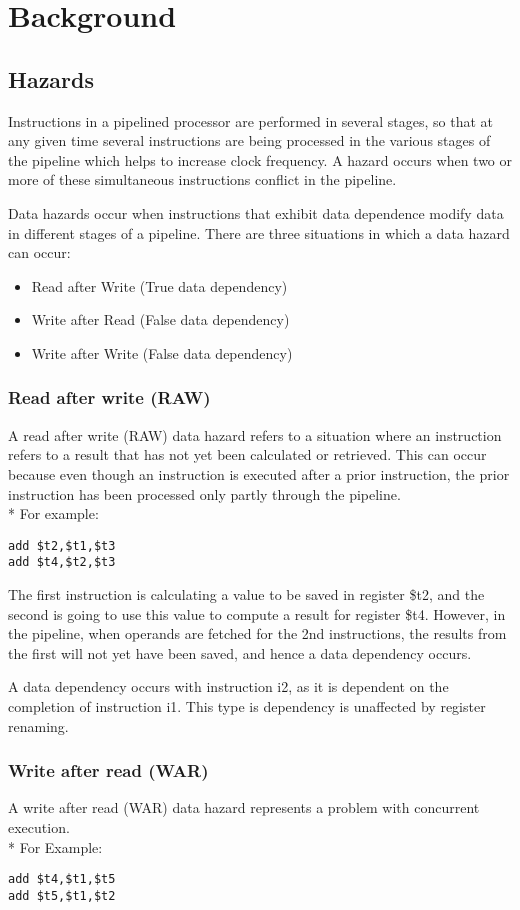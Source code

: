 \chapter{Background}
\section{Hazards}
Instructions in a pipelined processor are performed in several stages, so that at any given time several instructions are being processed in the various stages of the pipeline which helps to increase clock frequency.  A hazard occurs when two or more of these simultaneous instructions conflict in the pipeline.


Data hazards occur when instructions that exhibit data dependence modify data in different stages of a pipeline. There are three situations in which a data hazard can occur:
\begin{itemize}
  \item Read after Write (True data dependency)
  \item Write after Read (False data dependency)
  \item Write after Write (False data dependency)
\end{itemize}
\subsection{Read after write (RAW)}
A read after write (RAW) data hazard refers to a situation where an instruction refers to a result that has not yet been calculated or retrieved. This can occur because even though an instruction is executed after a prior instruction, the prior instruction has been processed only partly through the pipeline.
\\*
For example:
\begin{lstlisting}
add $t2,$t1,$t3
add $t4,$t2,$t3
\end{lstlisting}
The first instruction is calculating a value to be saved in register \$t2, and the second is going to use this value to compute a result for register \$t4. However, in the pipeline, when operands are fetched for the 2nd instructions, the results from the first will not yet have been saved, and hence a data dependency occurs.

A data dependency occurs with instruction i2, as it is dependent on the completion of instruction i1. This type is dependency is unaffected by register renaming.

\subsection{Write after read (WAR)}
A write after read (WAR) data hazard represents a problem with concurrent execution.  \\*
For Example:
\begin{lstlisting}
add $t4,$t1,$t5
add $t5,$t1,$t2
\end{lstlisting}

